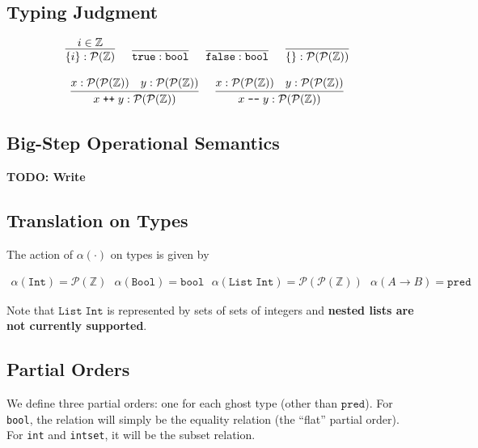 \documentclass[10pt]{article}
\newcommand{\ttt}[1]{\texttt{#1}}
\newcommand{\ra}{\ensuremath{\rightarrow}}
\newcommand{\Int}{\ttt{Int}}
\newcommand{\Bool}{\ttt{Bool}}
\newcommand{\List}{\ttt{List}}
\newcommand{\bool}{\ttt{bool}}
\newcommand{\pred}{\ttt{pred}}
\newcommand{\true}{\ttt{true}}
\newcommand{\false}{\ttt{false}}
\newcommand{\labinfer} [3] [] {\infer[{\small\textsc{#1}}]{#2}{#3}}
\newcommand{\PZ} {\mathcal{P}(\mathbb{Z})}
\newcommand{\PPZ} {\mathcal{P}(\PZ)}
\begin{document}
\subsection{Typing Judgment}
\[
  \begin{array}{cc}
    \labinfer{\{i\} : \PZ}{i \in \mathbb{Z}}
    ~~~
    \labinfer{\true : \bool}{}
    ~~~
    \labinfer{\false : \bool}{}
    ~~~
    \labinfer{\{\} : \PPZ}{}
    \\\\
    \labinfer{x\; \ttt{++}\; y : \PPZ}{x : \PPZ & y : \PPZ}
    ~~~
    \labinfer{x\; \ttt{-{}-}\; y : \PPZ}{x : \PPZ & y : \PPZ}

  \end{array}
\]

\subsection{Big-Step Operational Semantics}

\textbf{TODO: Write}


\subsection{Translation on Types}

The action of $\alpha(\cdot)$ on types is given by

\[
  \begin{array}{cc}
    \alpha(\Int) = \PZ
    ~~~
    \alpha(\Bool) = \bool
    ~~~
    \alpha(\List\; \Int) = \PPZ
    ~~~
    \alpha(A \ra B) = \pred
  \end{array}
\]

Note that $\List\; \Int$ is represented by sets of sets of integers and \textbf{nested lists are not currently supported}.

\subsection{Partial Orders}

We define three partial orders: one for each ghost type (other than $\pred$). For \verb|bool|, the relation
will simply be the equality relation (the ``flat'' partial order). For \verb|int| and \verb|intset|, it will be
the subset relation.
\end{document}
